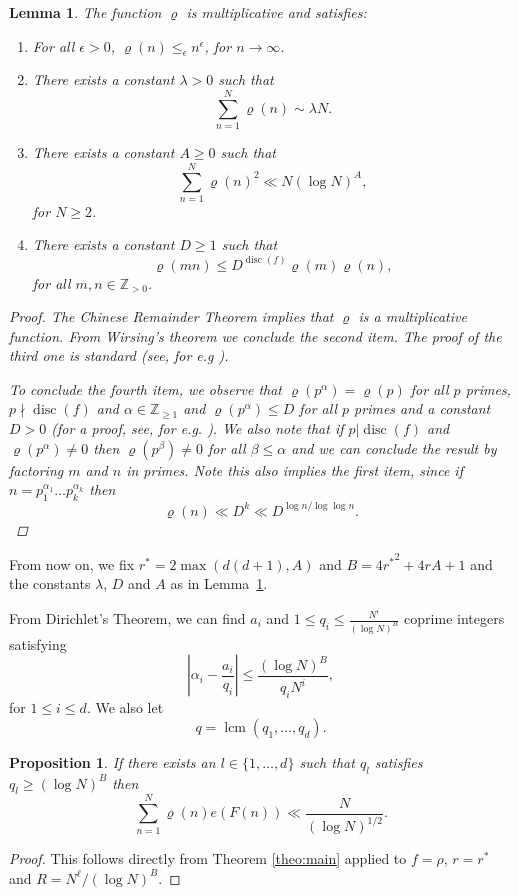 \documentclass[12pt]{amsart}
\newtheorem{lemma}{Lemma}
\newtheorem{prop}{Proposition}
\def\Z{{\mathbb Z}}
\def\le{\leqslant}
\def\ge{\geqslant}
\begin{document}
\begin{lemma}
\label{lemma:rhoprop}
The function $\varrho$ is multiplicative and satisfies:
\begin{enumerate}
\item For all $\epsilon >0$, $\varrho(n)\le_{\epsilon} n^{\epsilon}$, for $n\rightarrow \infty$.
\item There exists a constant $\lambda >0$ such that $$ \sum_{n=1}^N \varrho(n) \sim   \lambda N. $$ 
\item There exists a constant $A\ge0$ such that$$ \sum_{n=1}^N \varrho(n)^2 \ll N (\log{N})^A,$$ for $N \ge 2$. 
\item There exists a constant $D\ge 1$ such that $$\varrho(mn) \le D^{\operatorname{disc}(f)} \varrho(m)\varrho(n),$$  for all $m,n \in \Z_{> 0}$.
\end{enumerate}
\begin{proof}
The Chinese Remainder Theorem implies that $\varrho$ is a multiplicative function. From Wirsing's theorem \cite[Satz 1]{Wirs} we conclude the second item. The proof of the third one is standard (see, for e.g \cite[Lemma 2.7]{pollack}).

To conclude the fourth item, we observe that
$\varrho(p^\alpha) = \varrho(p)$ for all $p$ primes, $p\nmid \operatorname{disc}(f)$ and $\alpha \in \Z_{\ge 1}$ and  $\varrho(p^\alpha) \le D$ for all $p$ primes and a constant $D>0$ (for a proof, see, for e.g.   \cite[Lemma 2.4]{pollack}).  We also note that if $p| \operatorname{disc}(f)$ and $\varrho(p^\alpha) \neq 0$ then $\varrho(p^\beta) \neq 0$ for all $\beta \le \alpha$ and we can conclude the result by factoring $m$ and $n$ in primes. Note this also implies the first item, since if $n=p_1^{\alpha_1}\dots p_k^{\alpha_k}$ then 
$$\varrho(n)\ll D^{k}\ll D^{\log{n}/{\log\log{n}}}.$$
\end{proof}
\end{lemma}

From now on, we fix $r^\ast = 2\max(d(d+1),A)$ and  $B=4{r^\ast}^2 +4rA+1$ and the constants $\lambda$, $D$ and $A$ as in Lemma~\ref{lemma:rhoprop}.  

 From Dirichlet's Theorem, we can find  $a_i$ and $1 \le q_i \le \frac{N^i}{(\log{N})^B}$ coprime integers satisfying
\begin{equation}
\label{eq:aprox}
\left| \alpha_i - \frac{a_i}{q_i} \right| \le \frac{ (\log{N})^B}{q_iN^i},
\end{equation} 
for $1 \le i \le d$.  We also let $$q=\operatorname{lcm}(q_1, \ldots, q_d).$$
\begin{prop}
\label{prop:qbig}
If there exists an $l \in \{1, \ldots, d\}$ such that $q_l$ satisfies $q_l \ge (\log{N})^B$ then
\begin{equation*}
\sum_{n=1}^N \varrho(n)e(F(n)) \ll \frac{N}{(\log{N})^{1/2}}.
\end{equation*}
\end{prop}
\begin{proof}
This follows directly from Theorem \ref{theo:main} applied to $f=\rho$, $r = r^\ast$ and $R=N^{\ell}/(\log{N})^B$.
\end{proof}
\end{document}
